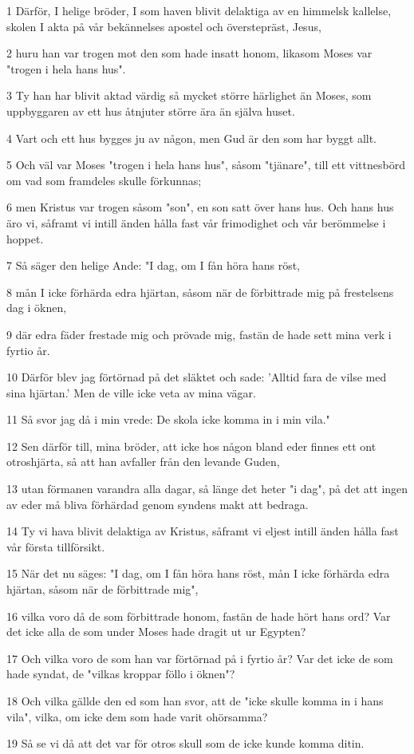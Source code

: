 \par 1 Därför, I helige bröder, I som haven blivit delaktiga av en himmelsk kallelse, skolen I akta på vår bekännelses apostel och överstepräst, Jesus,
\par 2 huru han var trogen mot den som hade insatt honom, likasom Moses var "trogen i hela hans hus".
\par 3 Ty han har blivit aktad värdig så mycket större härlighet än Moses, som uppbyggaren av ett hus åtnjuter större ära än själva huset.
\par 4 Vart och ett hus bygges ju av någon, men Gud är den som har byggt allt.
\par 5 Och väl var Moses "trogen i hela hans hus", såsom "tjänare", till ett vittnesbörd om vad som framdeles skulle förkunnas;
\par 6 men Kristus var trogen såsom "son", en son satt över hans hus. Och hans hus äro vi, såframt vi intill änden hålla fast vår frimodighet och vår berömmelse i hoppet.
\par 7 Så säger den helige Ande: "I dag, om I fån höra hans röst,
\par 8 mån I icke förhärda edra hjärtan, såsom när de förbittrade mig på frestelsens dag i öknen,
\par 9 där edra fäder frestade mig och prövade mig, fastän de hade sett mina verk i fyrtio år.
\par 10 Därför blev jag förtörnad på det släktet och sade: 'Alltid fara de vilse med sina hjärtan.' Men de ville icke veta av mina vägar.
\par 11 Så svor jag då i min vrede: De skola icke komma in i min vila."
\par 12 Sen därför till, mina bröder, att icke hos någon bland eder finnes ett ont otroshjärta, så att han avfaller från den levande Guden,
\par 13 utan förmanen varandra alla dagar, så länge det heter "i dag", på det att ingen av eder må bliva förhärdad genom syndens makt att bedraga.
\par 14 Ty vi hava blivit delaktiga av Kristus, såframt vi eljest intill änden hålla fast vår första tillförsikt.
\par 15 När det nu säges: "I dag, om I fån höra hans röst, mån I icke förhärda edra hjärtan, såsom när de förbittrade mig",
\par 16 vilka voro då de som förbittrade honom, fastän de hade hört hans ord? Var det icke alla de som under Moses hade dragit ut ur Egypten?
\par 17 Och vilka voro de som han var förtörnad på i fyrtio år? Var det icke de som hade syndat, de "vilkas kroppar föllo i öknen"?
\par 18 Och vilka gällde den ed som han svor, att de "icke skulle komma in i hans vila", vilka, om icke dem som hade varit ohörsamma?
\par 19 Så se vi då att det var för otros skull som de icke kunde komma ditin.

